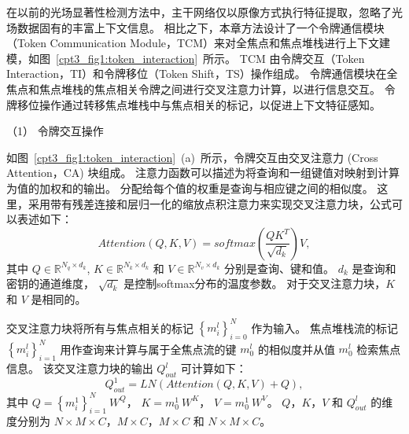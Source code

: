 在以前的光场显著性检测方法中，主干网络仅以原像方式执行特征提取，忽略了光场数据固有的丰富上下文信息。 相比之下，本章方法设计了一个令牌通信模块（Token Communication Module，TCM）来对全焦点和焦点堆栈进行上下文建模，如图~\ref{cpt3_fig1:token_interaction}~所示。
TCM 由令牌交互（Token Interaction，TI）和令牌移位（Token Shift，TS）操作组成。 
令牌通信模块在全焦点和焦点堆栈的焦点相关令牌之间进行交叉注意力计算，以进行信息交互。 
令牌移位操作通过转移焦点堆栈中与焦点相关的标记，以促进上下文特征感知。 








（1）
令牌交互操作


如图~\ref{cpt3_fig1:token_interaction}~(a)~所示，令牌交互由交叉注意力 (Cross Attention，CA) 块组成。 
注意力函数可以描述为将查询和一组键值对映射到计算为值的加权和的输出。 
分配给每个值的权重是查询与相应键之间的相似度。 
这里，采用带有残差连接和层归一化的缩放点积注意力来实现交叉注意力块，公式可以表述如下：
%
%
%
\begin{equation}
	Attention(Q,K,V) = softmax \left ( \frac{QK^{T}}{\sqrt{d_{k}}} \right ) V,
\end{equation}
%
%
其中
$ Q \in \mathbb{R}^{N_{q}\times d_{k}}  $,
$ K \in \mathbb{R}^{N_{k}\times d_{k}}  $ 和
$ V \in \mathbb{R}^{N_{v}\times d_{k}}  $ 
分别是查询、键和值。 
$ d_{k} $ 是查询和密钥的通道维度，
$ \sqrt{d_{k}} $ 是控制softmax分布的温度参数。 
对于交叉注意力块，$K$ 和 $V$ 是相同的。 






交叉注意力块将所有与焦点相关的标记 $ \left \{ m_{i}^{l} \right \}_{i=0}^{N} $ 作为输入。 焦点堆栈流的标记 $ \left \{  m_{i}^{l} \right \}_{i=1}^{N} $ 用作查询来计算与属于全焦点流的键 $ m_{0}^{l} $ 的相似度并从值 $ m_{0}^{l} $ 检索焦点信息。 该交叉注意力块的输出 $ Q_{out}^{l} $ 可计算如下：
%
%
\begin{equation}
	Q_{out}^{1} = LN \left ( Attention(Q,K,V) + Q \right ),
\end{equation}
%
%
其中
$ Q = \left \{ m_{i}^{1} \right \}_{i=1}^{N}~ W^{Q}$，
$ K= m_{0}^{1} ~W^{K} $，
$ V =  m_{0}^{1}~ W^{V} $。
$ Q$，$K$，$V$ 和 $ Q_{out}^{l} $
的维度分别为 
$ N \times M \times C $，$ M \times C $，$ M \times C $ 
和
 $ N \times M \times C $。 


















